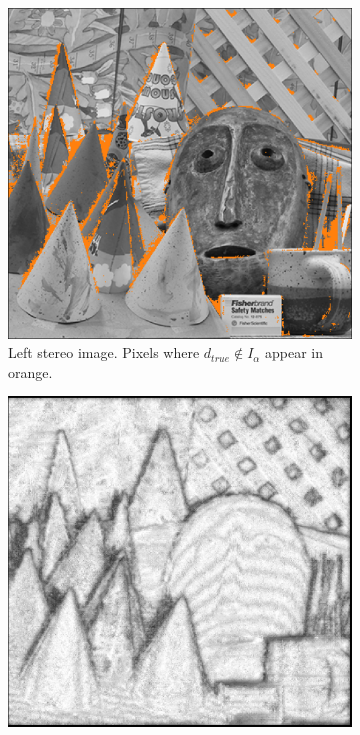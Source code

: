 \begin{figure}
    \centering
    \begin{subfigure}[t]{0.3\linewidth}
        \centering
        \includegraphics[width=\linewidth]{Images/Chap_5/wrong_intervals_no_reg.png}
        \caption{Left stereo image. Pixels where $d_{true}\not\in I_\alpha$ appear in orange.}
        \label{fig:wrong_intervals}
    \end{subfigure}\hfill
    \begin{subfigure}[t]{0.3\linewidth}
        \centering
        \includegraphics[width=\linewidth]{Images/Chap_5/ambiguity_cones.png}

\end{subfigure}
\end{figure}
